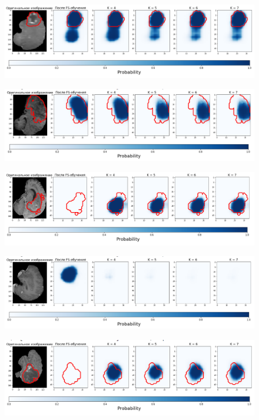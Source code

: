 \begin{figure}[h!] 
  \center
  \includegraphics [scale=0.7] {images/good_12.png}
\end{figure}

\begin{figure}[h!] 
  \center
  \includegraphics [scale=0.7] {images/good_13.png}
\end{figure}

\begin{figure}[h!] 
  \center
  \includegraphics [scale=0.7] {images/good_14.png}
\end{figure}

\begin{figure}[h!] 
  \center
  \includegraphics [scale=0.7] {images/good_15.png}
\end{figure}


\begin{figure}[h!] 
  \center
  \includegraphics [scale=0.7] {images/good_16.png}
\end{figure}


